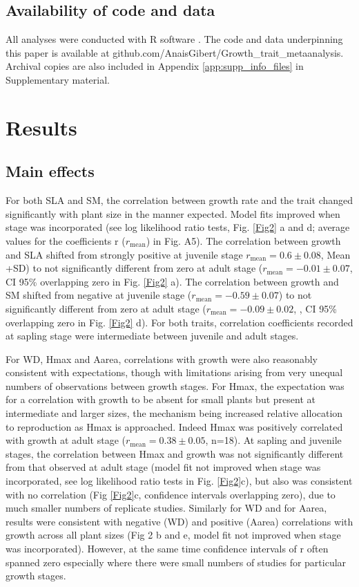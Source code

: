 \documentclass[a4paper]{article}\usepackage[]{graphicx}\usepackage[]{color}
\begin{document}
\subsection*{Availability of code and data}\label{code}

All analyses were conducted with R software \citep{Ralanguageanden:2014wf}. The code and data underpinning this paper is available at github.com/AnaisGibert/Growth\_trait\_metaanalysis. Archival copies are also included in Appendix \ref{app:supp_info_files} in Supplementary material.

\section*{Results}\label{results}

\subsection*{Main effects}

For both SLA and SM, the correlation between growth rate and the trait changed significantly with plant size in the manner expected. Model fits improved when stage was incorporated (see log likelihood ratio tests, Fig. \ref{Fig2} a and d; average values for the coefficients r ($r_{\textrm{mean}}$) in Fig. A5). The correlation between growth and SLA shifted from strongly positive at juvenile stage $r_{\textrm{mean}}=0.6 \pm 0.08$, Mean +SD) to not significantly different from zero at adult stage ($r_{\textrm{mean}}= -0.01 \pm 0.07$, CI 95\% overlapping zero in Fig. \ref{Fig2} a). The correlation between growth and SM shifted from negative at juvenile stage ($r_{\textrm{mean}}= -0.59 \pm 0.07$) to not significantly different from zero at adult stage ($r_{\textrm{mean}}= -0.09 \pm 0.02$, , CI 95\% overlapping zero in Fig. \ref{Fig2} d). For both traits,  correlation coefficients recorded at sapling stage were intermediate between juvenile and adult stages. 

For WD, Hmax and Aarea, correlations with growth were also reasonably consistent with expectations, though with limitations arising from very unequal numbers of observations between growth stages. For Hmax, the expectation was for a correlation with growth to be absent for small plants but present at intermediate and larger sizes, the mechanism being increased relative allocation to reproduction as Hmax is approached. Indeed Hmax was positively correlated with growth at adult stage ($r_{\textrm{mean}}= 0.38 \pm 0.05$, n=18). At sapling and juvenile stages, the correlation between Hmax and growth was not significantly different from that observed at adult stage (model fit not improved when stage was incorporated, see log likelihood ratio tests in Fig. \ref{Fig2}c), but also was consistent with no correlation (Fig \ref{Fig2}c, confidence intervals overlapping zero), due to much smaller numbers of replicate studies. Similarly for WD and for Aarea, results were consistent with negative (WD) and positive (Aarea) correlations with growth across all plant sizes (Fig 2 b and e, model fit not improved when stage was incorporated). However, at the same time confidence intervals of r often spanned zero especially where there were small numbers of studies for particular growth stages. 
\end{document}
